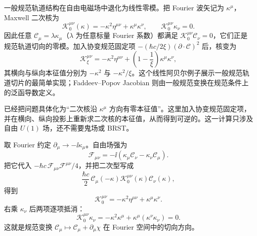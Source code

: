 \begin{exbox}[自由 $U(1)$ 场中的规范零模]
一般规范轨道结构在自由电磁场中退化为线性零模。把 Fourier 波矢记为 $\kappa^\mu$，Maxwell 二次核为
\begin{equation}
 \boxed{
 \mathcal K_0^{\mu\nu}(\kappa)
 =-\kappa^2\eta^{\mu\nu}+\kappa^\mu\kappa^\nu,
 \qquad
 \mathcal K_0^{\mu\nu}\kappa_\nu=0.}
 \label{eq:u1-gauge-zero-mode-dp50}
\end{equation}
因此任意 $\mathscr C_\mu=\lambda\kappa_\mu$（$\lambda$ 为任意标量 Fourier 系数）都满足 $\mathcal K_0^{\mu\nu}\mathscr C_\nu=0$，它们正是规范轨道切向的零模。加入协变规范固定项 $-(\hbar c/2\xi)(\partial\!\cdot\!\mathscr C)^2$ 后，核变为
\begin{equation}
 \boxed{
 \mathcal K_\xi^{\mu\nu}
 =-\kappa^2\eta^{\mu\nu}
 +\left(1-\frac1\xi\right)\kappa^\mu\kappa^\nu,}
 \label{eq:u1-gauge-fixed-kernel-dp50}
\end{equation}
其横向与纵向本征值分别为 $-\kappa^2$ 与 $-\kappa^2/\xi$。这个线性阿贝尔例子展示一般规范轨道切片的最简单实现；Faddeev--Popov Jacobian 则由一般规范变换在规范条件上的泛函导数定义。

\medskip

 已经把问题具体化为“二次核沿 $\kappa^\mu$ 方向有零本征值”。这里加入协变规范固定项，并在横向、纵向投影上重新求二次核的本征值，从而得到可逆的。这一计算只涉及自由 $U(1)$ 场，还不需要鬼场或 BRST。

取 Fourier 约定 $\partial_\mu\to-\ii\kappa_\mu$。自由场强为
\begin{equation*}
 \mathcal F_{\mu\nu}
 =-\ii(\kappa_\mu\mathscr C_\nu-\kappa_\nu\mathscr C_\mu).
\end{equation*}
把它代入 $-\hbar c\,\mathcal F_{\mu\nu}\mathcal F^{\mu\nu}/4$，并把二次型写成
\begin{equation*}
 \frac{\hbar c}{2}\,
 \mathscr C_\mu(-\kappa)\mathcal K_0^{\mu\nu}(\kappa)\mathscr C_\nu(\kappa),
\end{equation*}
得到
\begin{equation*}
 \mathcal K_0^{\mu\nu}
 =-\kappa^2\eta^{\mu\nu}+\kappa^\mu\kappa^\nu.
\end{equation*}
右乘 $\kappa_\nu$ 后两项逐项抵消：
\begin{equation*}
 \mathcal K_0^{\mu\nu}\kappa_\nu
 =-\kappa^2\kappa^\mu+\kappa^\mu(\kappa^\nu\kappa_\nu)=0.
\end{equation*}
这就是规范变换 $\mathscr C_\mu\mapsto\mathscr C_\mu+\partial_\mu\chi$ 在 Fourier 空间中的切向方向。


\end{exbox}
